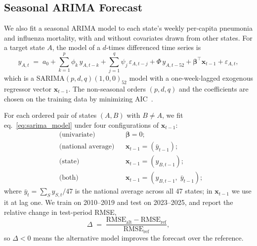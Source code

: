 \subsection{Seasonal ARIMA Forecast}\label{subsec:sarimabench}
We also fit a seasonal ARIMA model to each state's weekly per-capita
pneumonia and influenza mortality, with and without covariates
drawn from other states. For a target state $A$, the model
of a $d$-times differenced time series is
\begin{equation}\label{eq:sarima_model}
  y_{A,t}  \;=\; a_0
    + \sum_{k=1}^{p} \phi_k\, y_{A, t-k}
    + \sum_{j=1}^{q} \psi_j\, \varepsilon_{A, t-j}
    + \Phi\, y_{A, t-52}
    + \boldsymbol{\beta}^{\!\top} \mathbf{x}_{t-1}
    + \varepsilon_{A,t},
\end{equation}
which is a SARIMA$(p,d,q)(1,0,0)_{52}$ model with a one-week-lagged
exogenous regressor vector $\mathbf{x}_{t-1}$.
The non-seasonal orders $(p, d, q)$ and the coefficients are chosen on
the training data by minimizing AIC~\citep{hyndman2008}.

For each ordered pair of states $(A, B)$ with $B \neq A$, we fit
eq.~\eqref{eq:sarima_model} under four configurations of
$\mathbf{x}_{t-1}$:
\begin{align*}
  &\text{(univariate)} && \boldsymbol{\beta} = 0; \\
  &\text{(national average)}  && \mathbf{x}_{t-1} = (\bar y_{t-1}); \\
  &\text{(state)}  && \mathbf{x}_{t-1} = (y_{B, t-1}); \\
  &\text{(both)} && \mathbf{x}_{t-1} = (y_{B, t-1},\; \bar y_{t-1});
\end{align*}
where $\bar y_{t} = \sum_{S} y_{S, t} / 47$ is the national
average across all 47 states; in $\mathbf{x}_{t-1}$ we use it at lag one. We train on 2010--2019 and test on
2023--2025, and report the relative change in test-period RMSE,
\begin{equation}\label{eq:sarima_delta}
  \Delta \;=\; \frac{\text{RMSE}_{\mathrm{alt}} - \text{RMSE}_{\mathrm{ref}}}{\text{RMSE}_{\mathrm{ref}}},
\end{equation}
so $\Delta < 0$ means the alternative model improves the forecast over
the reference.

